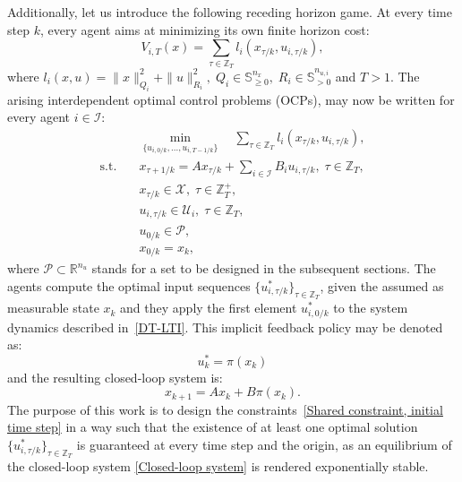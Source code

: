 \documentclass[letterpaper, 10 pt, conference]{ieeeconf}  %
\begin{document}
Additionally, let us introduce the following receding horizon game. At every time step $k$, every agent aims at minimizing its own finite horizon cost:
\begin{equation}\label{Finite Horizon Cost}
V_{i,T}(x) = \sum_{\tau \in \mathbb{Z}_{T}}l_{i}(x_{\tau/k}, u_{i,\tau/k}),
\end{equation}
where $l_{i}(x, u) = \|x\|^{2}_{{Q}_{i}} + \|u\|^{2}_{R_{i}},\; Q_{i} \in \mathbb{S}^{n_x}_{\geq 0},\; R_{i} \in \mathbb{S}^{n_{u,i}}_{> 0}$ and $T > 1$. The arising interdependent optimal control problems (OCPs), may now be written for every agent $i \in \mathcal{I}$:
\begin{subequations}\label{Interdependent Optimal Control Problems, preliminary version}
\begin{align}
& \min_{\{u_{i,0/k},...,u_{i,T-1/k}\}} \quad \sum_{\tau \in \mathbb{Z}_{T}}l_{i}(x_{\tau/k}, u_{i,\tau/k}),\\
\text{s.t.} \quad & x_{\tau+1/k} = A x_{\tau/k} + \sum_{i \in \mathcal{I}}B_{i}u_{i,\tau/k},\; \tau \in \mathbb{Z}_{T},\\
& x_{\tau/k} \in \mathcal{X},\; \tau \in \mathbb{Z}^{+}_{T},\\
& u_{i,\tau/k} \in \mathcal{U}_{i},\; \tau \in \mathbb{Z}_{T},\\
& u_{0/k} \in \mathcal{P}, \label{Shared constraint, initial time step}\\
& x_{0/k} = x_{k},
\end{align}
\end{subequations}
where $\mathcal{P} \subset \mathbb{R}^{n_u}$ stands for a set to be designed in the subsequent sections. The agents compute the optimal input sequences $\{u^{*}_{i,\tau/k}\}_{\tau \in \mathbb{Z}_{T}}$, given the assumed as measurable state $x_{k}$ and they apply the first element $u^{*}_{i,0/k}$ to the system dynamics described in~\eqref{DT-LTI}. This implicit feedback policy may be denoted as:
\begin{equation}\label{Implicit Feedback Policy}
u^{*}_{k} = \pi(x_{k})
\end{equation}
and the resulting closed-loop system is:
\begin{equation}\label{Closed-loop system}
x_{k+1} = A x_{k} + B\pi(x_{k}).
\end{equation}
The purpose of this work is to design the constraints~\eqref{Shared constraint, initial time step} in a way such that the existence of at least one optimal solution $\{u^{*}_{i,\tau/k}\}_{\tau \in \mathbb{Z}_{T}}$ is guaranteed at every time step and the origin, as an equilibrium of the closed-loop system \eqref{Closed-loop system} is rendered exponentially stable.
\end{document}
